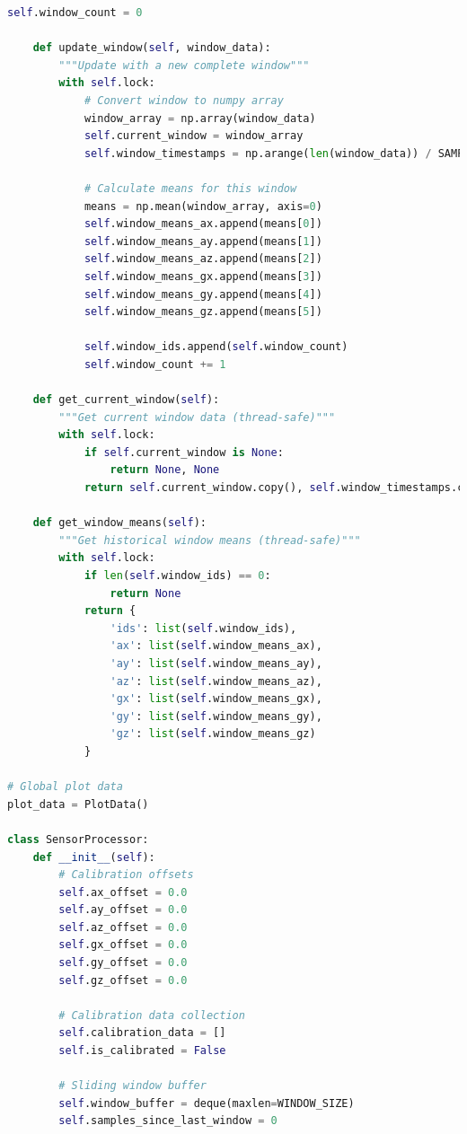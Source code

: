\documentclass[conference]{IEEEtran}
\begin{document}
\begin{lstlisting}[language=Python]
        self.window_count = 0
    
    def update_window(self, window_data):
        """Update with a new complete window"""
        with self.lock:
            # Convert window to numpy array
            window_array = np.array(window_data)
            self.current_window = window_array
            self.window_timestamps = np.arange(len(window_data)) / SAMPLE_RATE
            
            # Calculate means for this window
            means = np.mean(window_array, axis=0)
            self.window_means_ax.append(means[0])
            self.window_means_ay.append(means[1])
            self.window_means_az.append(means[2])
            self.window_means_gx.append(means[3])
            self.window_means_gy.append(means[4])
            self.window_means_gz.append(means[5])
            
            self.window_ids.append(self.window_count)
            self.window_count += 1
    
    def get_current_window(self):
        """Get current window data (thread-safe)"""
        with self.lock:
            if self.current_window is None:
                return None, None
            return self.current_window.copy(), self.window_timestamps.copy()
    
    def get_window_means(self):
        """Get historical window means (thread-safe)"""
        with self.lock:
            if len(self.window_ids) == 0:
                return None
            return {
                'ids': list(self.window_ids),
                'ax': list(self.window_means_ax),
                'ay': list(self.window_means_ay),
                'az': list(self.window_means_az),
                'gx': list(self.window_means_gx),
                'gy': list(self.window_means_gy),
                'gz': list(self.window_means_gz)
            }

# Global plot data
plot_data = PlotData()

class SensorProcessor:
    def __init__(self):
        # Calibration offsets
        self.ax_offset = 0.0
        self.ay_offset = 0.0
        self.az_offset = 0.0
        self.gx_offset = 0.0
        self.gy_offset = 0.0
        self.gz_offset = 0.0
        
        # Calibration data collection
        self.calibration_data = []
        self.is_calibrated = False
        
        # Sliding window buffer
        self.window_buffer = deque(maxlen=WINDOW_SIZE)
        self.samples_since_last_window = 0
        

\end{lstlisting}
\end{document}
